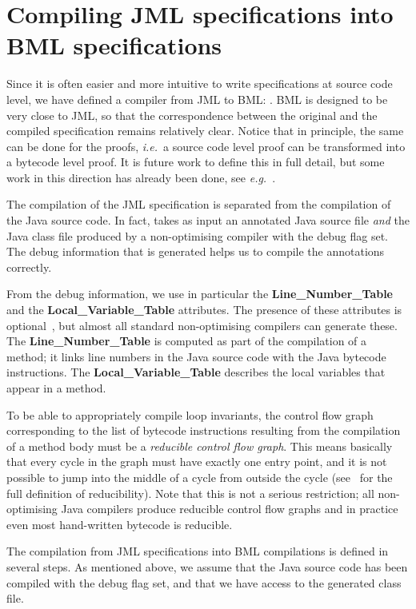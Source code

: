 \section{Compiling JML specifications into BML specifications}\label{SecJMLtoBML} 

Since it is often easier and more intuitive to write specifications at
source code level, we have defined a compiler from JML to BML:
\JMLtoBML. BML is designed to be very close to JML, so that the
correspondence between the original and the compiled specification
remains relatively clear. Notice that in principle, the same can be
done for the proofs,
\emph{i.e.}\ a source code level proof can be transformed into a
bytecode level proof. It is future work to define this in full detail,
but some work in this direction has already been done, see
\emph{e.g.}~\cite{BartheRS05}. 

The compilation of the JML specification is separated from the
compilation of the Java source code. In fact, \JMLtoBML takes as input
an annotated Java source file \emph{and} the Java class file produced
by a non-optimising compiler with the debug flag set. The debug
information that is generated helps us to compile the annotations
correctly. 

From the debug information, we use in particular the
\textbf{Line\_Number\_Table} and the \textbf{Local\_Variable\_Table}
attributes. The presence of these attributes is
optional~\cite{JVMspec}, but almost all standard non-optimising
compilers can generate these. The \textbf{Line\_Number\_Table} is
computed as part of the compilation of a method; it links line numbers
in the Java source code with the Java bytecode instructions.  The
\textbf{Local\_Variable\_Table} describes the local variables that
appear in a method.  

To be able to appropriately compile loop invariants, the control flow
graph corresponding to the list of bytecode instructions resulting
from the compilation of a method body must be a
\emph{reducible control flow graph}. This means basically that every 
cycle in the graph must have exactly one entry point, and it is not
possible to jump into the middle of a cycle from outside the cycle
(see~\cite{AhoSU86} for the full definition of reducibility). Note
that this is not a serious restriction; all non-optimising Java
compilers produce reducible control flow graphs and in practice even
most hand-written bytecode is reducible.

The compilation from JML specifications into BML compilations is
defined in several steps. As mentioned above, we assume that the Java
source code has been compiled with the debug flag set, and that we
have access to the generated class file.

